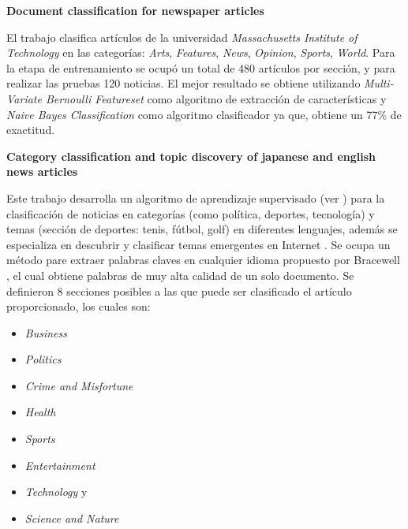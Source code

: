 \begin{large}
	 \textbf{Document classification for newspaper articles}\\
\end{large}

El trabajo clasifica artículos de la universidad \textit{Massachusetts Institute of Technology} \citep{CD4} en las categorías: \textit{Arts}, \textit{Features}, \textit{News}, \textit{Opinion}, \textit{Sports}, \textit{World}. Para la etapa de entrenamiento se ocupó un total de 480 artículos por sección, y para realizar las pruebas 120 noticias. El mejor resultado se obtiene utilizando \textit{Multi-Variate Bernoulli Featureset} como algoritmo de extracción de características y \textit{Naive Bayes Classification} como algoritmo clasificador ya que, obtiene  un 77\% de exactitud.\\



\begin{large}
	 \textbf{Category classification and topic discovery of japanese and english news articles}\\
\end{large}


Este trabajo desarrolla un algoritmo de aprendizaje supervisado (ver ) para la clasificación de noticias en categorías (como política, deportes, tecnología) y temas (sección de deportes: tenis, fútbol, golf) en diferentes lenguajes, además se especializa en descubrir y clasificar temas emergentes en Internet \citep{CD6}. Se ocupa un método pare extraer palabras claves en cualquier idioma propuesto por Bracewell \citep{CD5}, el cual obtiene palabras de muy alta calidad de un solo documento. Se definieron 8 secciones posibles a las que puede ser clasificado el artículo proporcionado, los cuales son:

\begin{itemize}

	\item \textit{Business} 
	\item \textit{Politics} 
	\item \textit{Crime and Misfortune} 
	\item \textit{Health} 
	\item \textit{Sports} 
	\item \textit{Entertainment} 
	\item \textit{Technology} y 
	\item \textit{Science and Nature}

\end{itemize}




